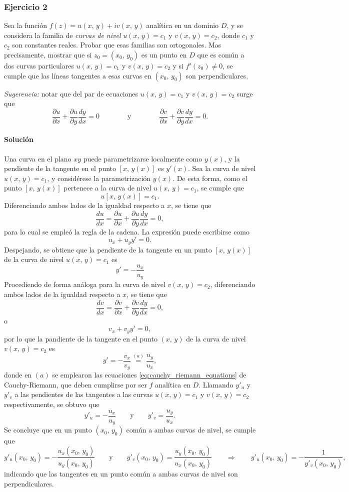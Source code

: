 \documentclass[a4paper]{report}
\begin{document}
\subsubsection{Ejercicio 2}

Sea la función \(f(z)=u(x,\,y)+iv(x,\,y)\) analítica en un dominio \(D\), y se considera la familia de \emph{curvas de nivel} \(u(x,\,y)=c_1\) y \(v(x,\,y)=c_2\), donde \(c_1\) y \(c_2\) son constantes reales. Probar que esas familias son ortogonales. Mas precisamente, mostrar que si \(z_0=(x_0,\,y_0)\) es un punto en \(D\) que es común a dos curvas particulares \(u(x,\,y)=c_1\) y \(v(x,\,y)=c_2\) y si \(f'(z_0)\neq0\), se cumple que las líneas tangentes a esas curvas en \((x_0,\,y_0)\) son perpendiculares. 

\emph{Sugerencia:} notar que del par de ecuaciones \(u(x,\,y)=c_1\) y \(v(x,\,y)=c_2\) surge que
\[
 \frac{\partial u}{\partial x}+\frac{\partial u}{\partial y}\frac{dy}{dx}=0
 \qquad\qquad\textrm{y}\qquad\qquad
 \frac{\partial v}{\partial x}+\frac{\partial v}{\partial y}\frac{dy}{dx}=0.
\]

\paragraph{Solución} Una curva en el plano \(xy\) puede parametrizarse localmente como \(y(x)\), y la pendiente de la tangente en el punto \([x,\,y(x)]\) es \(y'(x)\). Sea la curva de nivel \(u(x,\,y)=c_1\), y considérese la parametrización \(y(x)\). De esta forma, como el punto \([x,\,y(x)]\) pertenece a la curva de nivel \(u(x,\,y)=c_1\), se cumple que 
\[
 u[x,\,y(x)]=c_1.
\]
Diferenciando ambos lados de la igualdad respecto a \(x\), se tiene que 
\[
 \frac{du}{dx}=\frac{\partial u}{\partial x}+\frac{\partial u}{\partial y}\frac{dy}{dx}=0,
\]
para lo cual se empleó la regla de la cadena. La expresión puede escribirse como
\[
 u_x+u_yy'=0.
\]
Despejando, se obtiene que la pendiente de la tangente en un punto \([x,\,y(x)]\) de la curva de nivel \(u(x,\,y)=c_1\) es
\[
 y'=-\frac{u_x}{u_y}
\]
Procediendo de forma análoga para la curva de nivel \(v(x,\,y)=c_2\), diferenciando ambos lados de la igualdad respecto a \(x\), se tiene que 
\[
 \frac{dv}{dx}=\frac{\partial v}{\partial x}+\frac{\partial v}{\partial y}\frac{dy}{dx}=0,
\]
o
\[
 v_x+v_yy'=0,
\]
por lo que la pandiente de la tangente en el punto \((x,\,y)\) de la curva de nivel \(v(x,\,y)=c_2\) es
\[
 y'=-\frac{v_x}{v_y}\overset{(a)}{=}\frac{u_y}{u_x},
\]
donde en \((a)\) se emplearon las ecuaciones \ref{eq:cauchy_riemann_equations} de Cauchy-Riemann, que deben cumplirse por ser \(f\) analítica en \(D\). Llamando \(y'_u\) y \(y'_v\) a las pendientes de las tangentes a las curvas \(u(x,\,y)=c_1\) y \(v(x,\,y)=c_2\) respectivamente, se obtuvo que 
\[
 y'_u=-\frac{u_x}{u_y}
  \qquad\textrm{y}\qquad
 y'_v=\frac{u_y}{u_x}. 
\]
Se concluye que en un punto \((x_0,\,y_0)\) común a ambas curvas de nivel, se cumple que 
\[
 y'_u(x_0,\,y_0)=-\frac{u_x(x_0,\,y_0)}{u_y(x_0,\,y_0)}
  \qquad\textrm{y}\qquad
 y'_v(x_0,\,y_0)=\frac{u_y(x_0,\,y_0)}{u_x(x_0,\,y_0)}
 \qquad\Rightarrow\qquad 
 y'_u(x_0,\,y_0)=-\frac{1}{y'_v(x_0,\,y_0)},
\]
indicando que las tangentes en un punto común a ambas curvas de nivel son perpendiculares.
\end{document}
